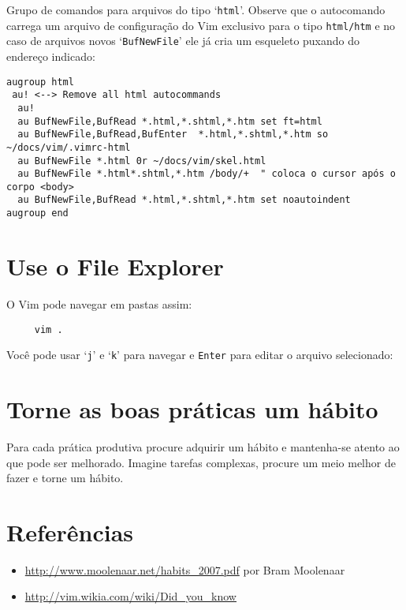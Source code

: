 Grupo de comandos para arquivos do tipo `{\tt html}'. Observe que o autocomando
carrega um arquivo de configuração do Vim exclusivo para o tipo {\tt html/htm}
e no caso de arquivos novos `{\tt BufNewFile}' ele já cria um esqueleto puxando
do endereço indicado:

\begin{verbatim}
augroup html
 au! <--> Remove all html autocommands
  au!
  au BufNewFile,BufRead *.html,*.shtml,*.htm set ft=html
  au BufNewFile,BufRead,BufEnter  *.html,*.shtml,*.htm so ~/docs/vim/.vimrc-html
  au BufNewFile *.html 0r ~/docs/vim/skel.html
  au BufNewFile *.html*.shtml,*.htm /body/+  " coloca o cursor após o corpo <body>
  au BufNewFile,BufRead *.html,*.shtml,*.htm set noautoindent
augroup end
\end{verbatim}


\section{Use o File Explorer}\label{Use o file explorer}

O Vim pode navegar em pastas assim:

\begin{verbatim}
     vim .
\end{verbatim}

Você pode usar `{\tt j}' e `{\tt k}' para navegar e {\tt Enter} para editar o arquivo
selecionado:

\section{Torne as boas práticas um hábito }
\label{Torne as boas práticas um hábito }

Para cada prática produtiva procure adquirir um hábito e mantenha-se
atento ao que pode ser melhorado. Imagine tarefas complexas, procure
um meio melhor de fazer e torne um hábito.

\section{Referências}
\begin{itemize}
   \item \url{http://www.moolenaar.net/habits\_2007.pdf} por Bram Moolenaar
   \item \url{http://vim.wikia.com/wiki/Did\_you\_know}
\end{itemize}
